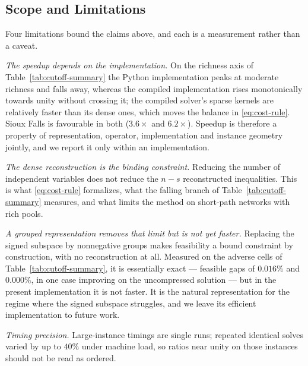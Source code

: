 \documentclass[11pt]{article}
\begin{document}
\subsection{Scope and Limitations}
\label{sec:scope-limits}


Four limitations bound the claims above, and each is a measurement rather than a caveat.

\emph{The speedup depends on the implementation.} On the richness axis of
Table~\ref{tab:cutoff-summary} the Python implementation peaks at moderate richness and falls
away, whereas the compiled implementation rises monotonically towards unity without crossing
it; the compiled solver's sparse kernels are relatively faster than its dense ones, which
moves the balance in \eqref{eq:cost-rule}. Sioux Falls is favourable in both ($3.6\times$ and
$6.2\times$). Speedup is therefore a property of representation, operator, implementation and
instance geometry jointly, and we report it only within an implementation.

\emph{The dense reconstruction is the binding constraint.} Reducing the number of independent
variables does not reduce the $n-s$ reconstructed inequalities. This is what
\eqref{eq:cost-rule} formalizes, what the falling branch of Table~\ref{tab:cutoff-summary}
measures, and what limits the method on short-path networks with rich pools.

\emph{A grouped representation removes that limit but is not yet faster.} Replacing the
signed subspace by nonnegative groups makes feasibility a bound constraint by construction,
with no reconstruction at all. Measured on the adverse cells of
Table~\ref{tab:cutoff-summary}, it is essentially exact --- feasible gaps of $0.016\%$ and
$0.000\%$, in one case improving on the uncompressed solution --- but in the present
implementation it is not faster. It is the natural representation for the regime where the
signed subspace struggles, and we leave its efficient implementation to future work.

\emph{Timing precision.} Large-instance timings are single runs; repeated identical solves
varied by up to $40\%$ under machine load, so ratios near unity on those instances should not
be read as ordered.
\end{document}
